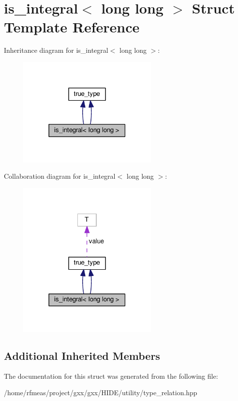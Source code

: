 \hypertarget{structis__integral_3_01long_01long_01_4}{}\section{is\+\_\+integral$<$ long long $>$ Struct Template Reference}
\label{structis__integral_3_01long_01long_01_4}


Inheritance diagram for is\+\_\+integral$<$ long long $>$\+:
\nopagebreak
\begin{figure}[H]
\begin{center}
\leavevmode
\includegraphics[width=198pt]{structis__integral_3_01long_01long_01_4__inherit__graph}
\end{center}
\end{figure}


Collaboration diagram for is\+\_\+integral$<$ long long $>$\+:
\nopagebreak
\begin{figure}[H]
\begin{center}
\leavevmode
\includegraphics[width=198pt]{structis__integral_3_01long_01long_01_4__coll__graph}
\end{center}
\end{figure}
\subsection*{Additional Inherited Members}


The documentation for this struct was generated from the following file\+:\begin{DoxyCompactItemize}
\item 
/home/rfmeas/project/gxx/gxx/\+H\+I\+D\+E/utility/type\+\_\+relation.\+hpp\end{DoxyCompactItemize}
